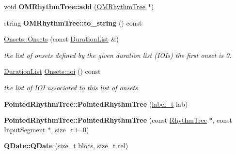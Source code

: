 \begin{DoxyCompactItemize}
\item 
\mbox{\label{group__output_ga6e273a3942470268fb775857d80bc2a8}} 
void {\bfseries O\+M\+Rhythm\+Tree\+::add} (\mbox{\hyperlink{classOMRhythmTree}{O\+M\+Rhythm\+Tree}} $\ast$)
\item 
\mbox{\label{group__output_ga14633b5c977b30f4a28085c686c3c17f}} 
string {\bfseries O\+M\+Rhythm\+Tree\+::to\+\_\+string} () const
\item 
\mbox{\hyperlink{group__output_ga6a3bc246737b5cc48df0e07b36e9935f}{Onsets\+::\+Onsets}} (const \mbox{\hyperlink{classDurationList}{Duration\+List}} \&)
\begin{DoxyCompactList}\small\item\em the list of onsets defined by the given duration list (I\+OI\textquotesingle{}s) the first onset is 0. \end{DoxyCompactList}\item 
\mbox{\label{group__output_gad3393b6422e8708954e27a52933620e1}} 
\mbox{\hyperlink{classDurationList}{Duration\+List}} \mbox{\hyperlink{group__output_gad3393b6422e8708954e27a52933620e1}{Onsets\+::ioi}} () const
\begin{DoxyCompactList}\small\item\em the list of I\+OI associated to this list of onsets. \end{DoxyCompactList}\item 
\mbox{\label{group__output_ga00153f3142fe2d750b995d95435d852e}} 
{\bfseries Pointed\+Rhythm\+Tree\+::\+Pointed\+Rhythm\+Tree} (\mbox{\hyperlink{group__output_ga22fde970e635fcf63962743b2d5c441d}{label\+\_\+t}} lab)
\item 
\mbox{\label{group__output_gad86382b8bc2a62cc5d8848c516280c52}} 
{\bfseries Pointed\+Rhythm\+Tree\+::\+Pointed\+Rhythm\+Tree} (const \mbox{\hyperlink{classRhythmTree}{Rhythm\+Tree}} $\ast$, const \mbox{\hyperlink{classInputSegment}{Input\+Segment}} $\ast$, size\+\_\+t i=0)
\item 
\mbox{\label{group__output_ga1151b393ffd2c621914c8e0641fff3d3}} 
{\bfseries Q\+Date\+::\+Q\+Date} (size\+\_\+t blocs, size\+\_\+t rel)
\item 
\mbox{\label{group__output_gab39d4fd438b410d8310f4bf43703904f}} 

\end{DoxyCompactItemize}
